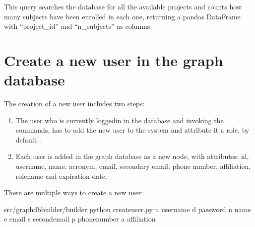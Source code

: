 \documentclass[letterpaper,10pt,english]{sphinxmanual}
\begin{document}
\begin{sphinxVerbatim}[commandchars=\\\{\}]
  
    
\end{sphinxVerbatim}

This query searches the database for all the available projects and counts how many subjects have been enrolled in each one, returning a pandas DataFrame with “project\_id” and “n\_subjects” as columns.


\section{Create a new user in the graph database}
\label{\detokenize{getting_started/create-new-user:create-a-new-user-in-the-graph-database}}\label{\detokenize{getting_started/create-new-user::doc}}
The creation of a new user includes two steps:
\begin{enumerate}
%
\item {} 
The user who is currently logged\sphinxhyphen{}in in the database and invoking the commands, has to add the new user to the system and attribute it a role, by default .

\item {} 
Each user is added in the graph database as a new  node, with attributes: id, username, name, acronym, email, secondary email, phone number, affiliation, rolename and expiration date.

\end{enumerate}

There are multiple ways to create a new user:

 

\begin{sphinxVerbatim}[commandchars=\\\{\}]
\PYGZdl{}  src/graphdb\PYGZus{}builder/builder
\PYGZdl{} python create\PYGZus{}user.py \PYGZhy{}u username \PYGZhy{}d password \PYGZhy{}n name \PYGZhy{}e email \PYGZhy{}s second\PYGZus{}email \PYGZhy{}p phone\PYGZus{}number \PYGZhy{}a affiliation
\end{sphinxVerbatim}
\end{document}
